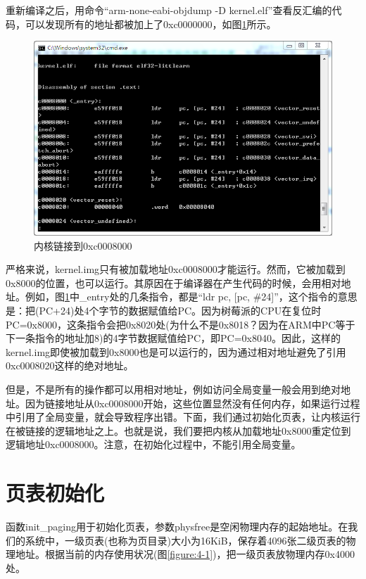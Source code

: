 \documentclass[main.tex]{subfiles}
\begin{document}
\begin{CJK*}{UTF8}{song}
\begin{code}
\label{code:4-2}
\inputminted[firstline=79,lastline=120,linenos,numbersep=5pt,frame=lines,framesep=2mm]{gas}{src/chapter04/kernel/entry.S}
\end{code}

重新编译之后，用命令“arm-none-eabi-objdump -D kernel.elf”查看反汇编的代码，可以发现所有的地址都被加上了0xc0000000，如图\ref{figure:4-5}所示。

\begin{figure}[htp]
\centering
\includegraphics[scale=0.5]{figures/4-5}
\caption{内核链接到0xc0008000}
\label{figure:4-5}
\end{figure}

严格来说，kernel.img只有被加载地址0xc0008000才能运行。然而，它被加载到0x8000的位置，也可以运行。其原因在于编译器在产生代码的时候，会用相对地址。例如，图\ref{figure:4-5}中\_entry处的几条指令，都是“ldr pc, [pc, \#24]”，这个指令的意思是：把(PC+24)处4个字节的数据赋值给PC。因为树莓派的CPU在复位时PC=0x8000，这条指令会把0x8020处(为什么不是0x8018？因为在ARM中PC等于下一条指令的地址加8)的4字节数据赋值给PC，即PC=0x8040。因此，这样的kernel.img即使被加载到0x8000也是可以运行的，因为通过相对地址避免了引用0xc0008020这样的绝对地址。

\par
但是，不是所有的操作都可以用相对地址，例如访问全局变量一般会用到绝对地址。因为链接地址从0xc0008000开始，这些位置显然没有任何内存，如果运行过程中引用了全局变量，就会导致程序出错。下面，我们通过初始化页表，让内核运行在被链接的逻辑地址之上。也就是说，我们要把内核从加载地址0x8000重定位到逻辑地址0xc0008000。注意，在初始化过程中，不能引用全局变量。

\section{页表初始化}
函数init\_paging用于初始化页表，参数physfree是空闲物理内存的起始地址。在我们的系统中，一级页表(也称为页目录)大小为16KiB，保存着4096张二级页表的物理地址。根据当前的内存使用状况(图\ref{figure:4-1})，把一级页表放物理内存0x4000处。


\end{CJK*}
\end{document}
